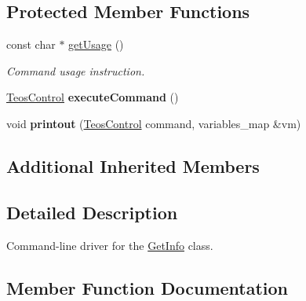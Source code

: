 \subsection*{Protected Member Functions}
\begin{DoxyCompactItemize}
\item 
const char $\ast$ \mbox{\hyperlink{classteos_1_1command_1_1_get_info_options_af5b6ec0a42f019ef1058e6f78a84346d}{get\+Usage}} ()
\begin{DoxyCompactList}\small\item\em Command \textquotesingle{}usage\textquotesingle{} instruction. \end{DoxyCompactList}\item 
\mbox{\label{classteos_1_1command_1_1_get_info_options_a34618d24dee722d76c13da4d2010fd63}} 
\mbox{\hyperlink{classteos_1_1_teos_control}{Teos\+Control}} {\bfseries execute\+Command} ()
\item 
\mbox{\label{classteos_1_1command_1_1_get_info_options_a2713f566133468d9d576e71bd3471f6d}} 
void {\bfseries printout} (\mbox{\hyperlink{classteos_1_1_teos_control}{Teos\+Control}} command, variables\+\_\+map \&vm)
\end{DoxyCompactItemize}
\subsection*{Additional Inherited Members}


\subsection{Detailed Description}
Command-\/line driver for the \mbox{\hyperlink{classteos_1_1command_1_1_get_info}{Get\+Info}} class. 

\subsection{Member Function Documentation}
\mbox{\label{classteos_1_1command_1_1_get_info_options_af5b6ec0a42f019ef1058e6f78a84346d}} 
